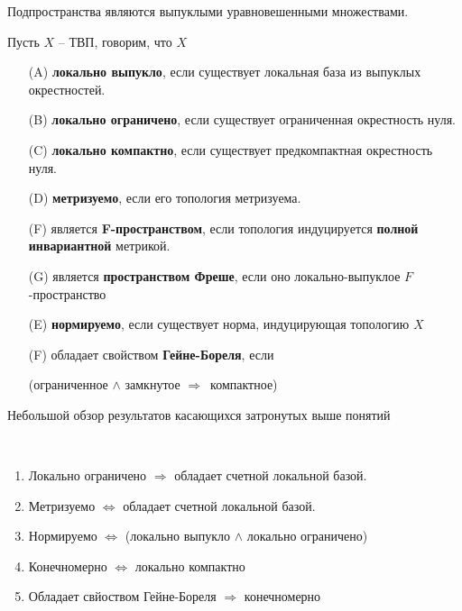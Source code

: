 \documentclass[12pt, a4paper, oneside]{book}
\begin{document}
\begin{remark}
Подпространства являются выпуклыми уравновешенными множествами.
\end{remark}

\begin{definition}
    Пусть $X$ -- ТВП, говорим, что $X$
    \begin{enumerate}
        \item[(A)] \textbf{локально выпукло}, если существует локальная база из выпуклых окрестностей.
        \item[(B)] \textbf{локально ограничено}, если существует ограниченная окрестность нуля.
        \item[(C)] \textbf{локально компактно}, если существует предкомпактная окрестность нуля.
        \item[(D)] \textbf{метризуемо}, если его топология метризуема.
        \item[(F)] является \textbf{F-пространством}, если топология индуцируется \textbf{полной инвариантной} метрикой.
        \item[(G)] является \textbf{пространством Фреше}, если оно локально-выпуклое $F$-пространство
        \item[(E)] \textbf{нормируемо}, если существует норма, индуцирующая топологию $X$
        \item[(F)] обладает свойством \textbf{Гейне-Бореля}, если
        \begin{center}(ограниченное $\wedge$ замкнутое $\Rightarrow\,$ компактное)
            \end{center}
    \end{enumerate}
\end{definition}

Небольшой обзор результатов касающихся затронутых выше понятий
\begin{theorem}\ \\
\begin{enumerate}
    \item Локально ограничено $\Rightarrow$ обладает счетной локальной базой.
    \item Метризуемо $\Leftrightarrow$ обладает счетной локальной базой.
    \item Нормируемо $\Leftrightarrow$ (локально выпукло $\wedge$ локально ограничено)
    \item Конечномерно  $\Leftrightarrow$ локально компактно
    \item Обладает свйоством Гейне-Бореля $\Rightarrow$ конечномерно
\end{enumerate}
\end{theorem}
\end{document}
